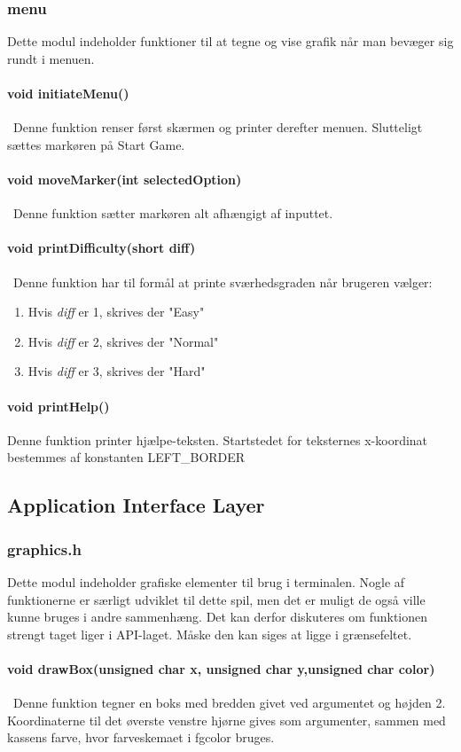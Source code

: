 \subsubsection{menu}
Dette modul indeholder funktioner til at tegne og vise grafik når man bevæger sig rundt i menuen.
\paragraph{void initiateMenu()}\
Denne funktion renser først skærmen og printer derefter menuen. Slutteligt sættes markøren på Start Game.
\paragraph{void moveMarker(int selectedOption)}\
Denne funktion sætter markøren alt afhængigt af inputtet.
\paragraph{void printDifficulty(short diff)}\
Denne funktion har til formål at printe sværhedsgraden når brugeren vælger:
\begin{enumerate}
\item Hvis \textit{diff} er 1, skrives der "Easy"
\item Hvis \textit{diff} er 2, skrives der "Normal"
\item Hvis \textit{diff} er 3, skrives der "Hard"
\end{enumerate}
\paragraph{void printHelp()}
Denne funktion printer hjælpe-teksten. Startstedet for teksternes x-koordinat bestemmes af konstanten LEFT\_BORDER

\subsection{Application Interface Layer}
\subsubsection{graphics.h}
Dette modul indeholder grafiske elementer til brug i terminalen. Nogle af funktionerne er særligt udviklet til dette spil, men det er muligt de også ville kunne bruges i andre sammenhæng.  Det kan derfor diskuteres om funktionen strengt taget liger i API-laget. Måske den kan siges at ligge i grænsefeltet.
\paragraph{
void drawBox(unsigned char x, unsigned char y,unsigned char color)}\
Denne funktion tegner en boks med bredden givet ved argumentet og højden 2. Koordinaterne til det øverste venstre hjørne gives som argumenter, sammen med kassens farve, hvor farveskemaet i fgcolor bruges.

